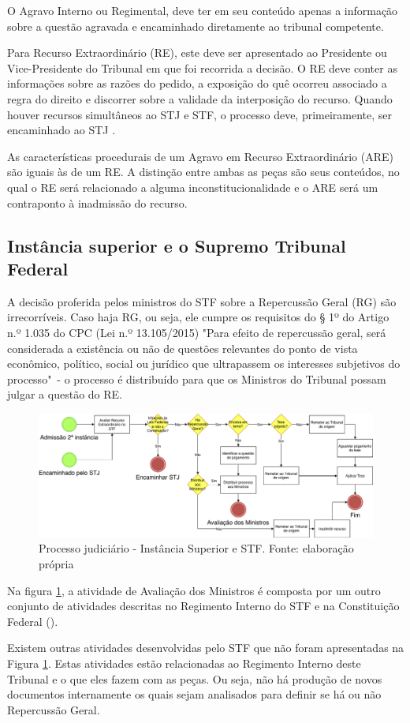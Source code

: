 O Agravo Interno ou Regimental, deve ter em seu conteúdo apenas a informação sobre a questão agravada e encaminhado diretamente ao tribunal competente.

Para Recurso Extraordinário (RE), este deve ser apresentado ao Presidente ou Vice-Presidente do Tribunal em que foi recorrida a decisão. O RE deve conter as informações sobre as razões do pedido, a exposição do quê ocorreu associado a regra do direito e discorrer sobre a validade da interposição do recurso. Quando houver recursos simultâneos ao STJ e STF, o processo deve, primeiramente, ser encaminhado ao STJ \cite{brasil_lei_2015}.

As características procedurais de um Agravo em Recurso Extraordinário (ARE) são iguais às de um RE. A distinção entre ambas as peças são seus conteúdos, no qual o RE será relacionado a alguma inconstitucionalidade e o ARE será um contraponto à inadmissão do recurso.

\subsection{Instância superior e o Supremo Tribunal Federal}

A decisão proferida pelos ministros do STF sobre a Repercussão Geral (RG) são irrecorríveis. Caso haja RG, ou seja, ele cumpre os requisitos do § 1º do Artigo n.º 1.035 do CPC (Lei n.º 13.105/2015)
"Para efeito de repercussão geral, será considerada a existência ou não de questões relevantes do ponto de vista econômico, político, social ou jurídico que ultrapassem os interesses subjetivos do processo"\ -  o processo é distribuído para que os Ministros do Tribunal possam julgar a questão do RE. 

\begin{figure}[ht]
	\centering
    \includegraphics[keepaspectratio=true,scale=0.4]{figuras/processoSuperior}
	\caption[Processo judiciário - Instância Superior]{Processo judiciário - Instância Superior e STF. Fonte: elaboração própria}
	\label{fig:processoSuperior}
\end{figure}

Na figura \ref{fig:processoSuperior}, a atividade de Avaliação dos Ministros é composta por um outro conjunto de atividades descritas no Regimento Interno do STF \cite{noauthor_regimento_2016} e na Constituição Federal (\citeyear{brasil_constituicao_1988}). 

Existem outras atividades desenvolvidas pelo STF que não foram apresentadas na Figura \ref{fig:processoSuperior}. Estas atividades estão relacionadas ao Regimento Interno \cite{noauthor_regimento_2016} deste Tribunal e o que eles fazem com as peças. Ou seja, não há produção de novos documentos internamente os quais sejam analisados para definir se há ou não Repercussão Geral.